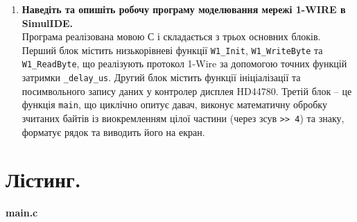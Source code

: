 \documentclass[14pt, a4paper]{extreport}
\begin{document}
\begin{enumerate}
		\item \textbf{Наведіть та опишіть робочу програму моделювання мережі 1-WIRE в SimulIDE.} \\ Програма реалізована мовою С і складається з трьох основних блоків. Перший блок містить низькорівневі функції \texttt{W1\_Init}, \texttt{W1\_WriteByte} та \texttt{W1\_ReadByte}, що реалізують протокол 1-Wire за допомогою точних функцій затримки \texttt{\_delay\_us}. Другий блок містить функції ініціалізації та посимвольного запису даних у контролер дисплея HD44780. Третій блок -- це функція \texttt{main}, що циклічно опитує давач, виконує математичну обробку зчитаних байтів із виокремленням цілої частини (через зсув \texttt{>> 4}) та знаку, форматує рядок та виводить його на екран.
	\end{enumerate}
	
	\pagebreak
	
	\section*{Лістинг.}
	
	\textbf{main.c}
	
\end{document}
